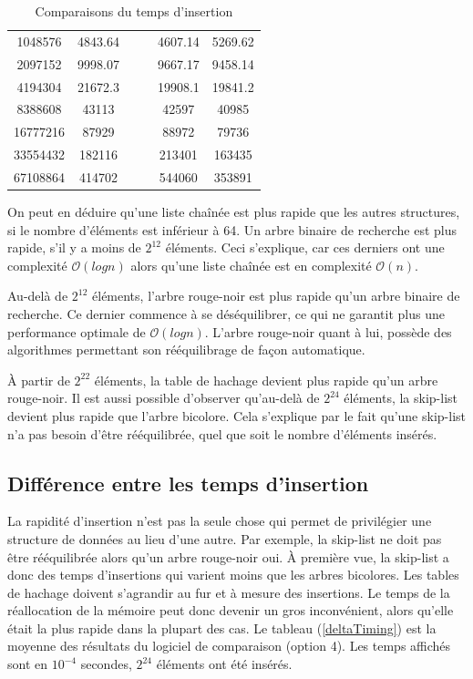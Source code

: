\documentclass[hidelinks,a4paper, 12pt]{article}
\begin{document}
\begin{table}[h]
{\begin{tabular}{|S[table-format=8.0]|S[table-format=6.3]|S[table-format=6.3]|S[table-format=6.3]|S[table-format=6.3]|S[table-format=6.3]|}
				1048576 & 4843.64 &  &  & 4607.14  & 5269.62 \\
				2097152 & 9998.07 &  &  & 9667.17 & 9458.14 {} \\
				4194304 & 21672.3 &  &  & 19908.1 & 19841.2 {} \\
				8388608 & 43113 &  &  & 42597 & 40985 {} \\
				16777216 & 87929 &  &  & 88972 & 79736 {} \\
				33554432 & 182116 &  &  & 213401 & 163435 {} \\
				67108864 & 414702 &  &  & 544060 & 353891 {} \\
				\hline
			\end{tabular}
		}
		\caption{Comparaisons du temps d'insertion}
		\label{compareAllTiming}
	\end{table}
	On peut en déduire qu'une liste chaînée est plus rapide que les autres structures, si le nombre d'éléments est inférieur à 64. Un arbre binaire de recherche est plus rapide, s'il y a moins de $2^{12}$ éléments. Ceci s'explique, car ces derniers ont une complexité $\mathcal{O}(log n)$ alors qu'une liste chaînée est en complexité $\mathcal{O}(n)$.
	
	Au-delà de $2^{12}$ éléments, l'arbre rouge-noir est plus rapide qu'un arbre binaire de recherche. Ce dernier commence à se déséquilibrer, ce qui ne garantit plus une performance optimale de $\mathcal{O}(log n)$. L'arbre rouge-noir quant à lui, possède des algorithmes permettant son rééquilibrage de façon automatique.
	
	À partir de $2^{22}$ éléments, la table de hachage devient plus rapide qu'un arbre rouge-noir. Il est aussi possible d'observer qu'au-delà de $2^{24}$ éléments, la skip-list devient plus rapide que l'arbre bicolore. Cela s'explique par le fait qu'une skip-list n'a pas besoin d'être rééquilibrée, quel que soit le nombre d'éléments insérés.
	
	\subsection{Différence entre les temps d'insertion}
	La rapidité d'insertion n'est pas la seule chose qui permet de privilégier une structure de données au lieu d'une autre. Par exemple, la skip-list ne doit pas être rééquilibrée alors qu'un arbre rouge-noir oui. À première vue, la skip-list a donc des temps d'insertions qui varient moins que les arbres bicolores. Les tables de hachage doivent s'agrandir au fur et à mesure des insertions. Le temps de la réallocation de la mémoire peut donc devenir un gros inconvénient, alors qu'elle était la plus rapide dans la plupart des cas. Le tableau (\cref{deltaTiming}) est la moyenne des résultats du logiciel de comparaison (option 4). Les temps affichés sont en $10^{-4}$ secondes, $2^{24}$ éléments ont été insérés.
	
\end{document}
